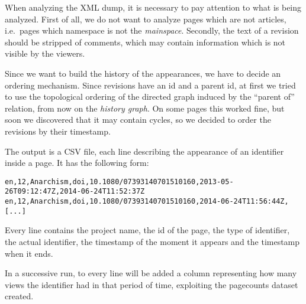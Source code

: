 When analyzing the XML dump, it is necessary to pay attention to what is being analyzed.
First of all, we do not want to analyze pages which are not articles, i.e.\ pages which namespace is not the \emph{mainspace}.
Secondly, the text of a revision should be stripped of comments, which may contain information which is not visible by the viewers.

Since we want to build the history of the appearances, we have to decide an ordering mechanism.
Since revisions have an id and a parent id, at first we tried to use the topological ordering of the directed graph induced by the ``parent of'' relation, from now on the \emph{history graph}.
On some pages this worked fine, but soon we discovered that it may contain cycles, so we decided to order the revisions by their timestamp.

The output is a CSV file, each line describing the appearance of an identifier inside a page.
It has the following form:
\begin{verbatim}
en,12,Anarchism,doi,10.1080/07393140701510160,2013-05-26T09:12:47Z,2014-06-24T11:52:37Z
en,12,Anarchism,doi,10.1080/07393140701510160,2014-06-24T11:56:44Z,
[...]
\end{verbatim}
Every line contains the project name, the id of the page, the type of identifier, the actual identifier, the timestamp of the moment it appears and the timestamp when it ends.

In a successive run, to every line will be added a column representing how many views the identifier had in that period of time, exploiting the pagecounts dataset created.
